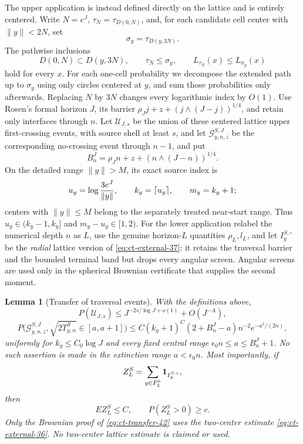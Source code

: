 \documentclass[12pt,reqno]{amsart}
\theoremstyle{plain}
\newtheorem{lemma}[theorem]{Lemma}
\theoremstyle{definition}
\theoremstyle{remark}
\numberwithin{equation}{section}
\begin{document}
The upper application is instead defined directly on the lattice and is
entirely centered.  Write $N=e^J$, $\tau_N=\tau_{D(0,N)}$, and, for
each candidate cell center with $\|y\|<2N$, set
\begin{equation}
\sigma_y=\tau_{D(y,3N)}.\label{eq:ct-transfer-39k}
\end{equation}
The pathwise inclusions
\begin{equation}
D(0,N)\subset D(y,3N),\qquad \tau_N\le\sigma_y,
 \qquad L_{\tau_N}(x)\le L_{\sigma_y}(x)\label{eq:ct-transfer-39l}
\end{equation}
hold for every $x$.  For each one-cell probability we decompose the
extended path up to $\sigma_y$ using only circles centered at $y$,
and sum those probabilities only afterwards.  Replacing $N$ by $3N$
changes every logarithmic index by $O(1)$.  Use Rosen's formal horizon
$J$, its barrier $\rho_Jj+z+(j\wedge(J-j))^{1/4}$, and retain only
interfaces through $n$.  Let $\mathcal{U}_{J,s}$ be the union of these
centered lattice upper first-crossing events, with source shell at least
$s$, and let
$\mathcal{G}^{S,J}_{y,n,z}$ be the corresponding no-crossing event through
$n-1$, and put
\[
B_n^J=\rho_Jn+z+(n\wedge(J-n))^{1/4}.
\]
On the detailed range $\|y\|>M$, its exact source index is
\begin{equation}
u_y=\log {3e^J\over\|y\|},\qquad
 k_y=\lceil u_y\rceil,\qquad m_y=k_y+1;\label{eq:ct-transfer-39m}
\end{equation}
centers with $\|y\|\le M$ belong to the separately treated near-start
range.  Thus $u_y\in(k_y-1,k_y]$ and $m_y-u_y\in[1,2)$.
For the lower application relabel the numerical depth $n$ as $L$,
use the genuine horizon-$L$ quantities $\rho_L,l_L$, and let
$I_y^{S,\circ}$ be the \emph{radial} lattice version of \eqref{eq:ct-external-37}: it retains
the traversal barrier and the bounded terminal band but drops every
angular screen.  Angular screens are used only in the spherical
Brownian certificate that supplies the second moment.

\begin{lemma}[Transfer of traversal events]\label{lem:buffered-transfer}
With the definitions above,
\begin{equation}
P(\mathcal{U}_{J,s})\le J^{-2s/\log J+o(1)}+O(J^{-A}),\label{eq:ct-transfer-40}
\end{equation}
\begin{equation}
P\big(\mathcal{G}^{S,J}_{y,n,z},
       \sqrt{2T^S_{y,n}}\in[a,a+1]\big)
 \le C(k_y+1)^C(2+B_n^J-a)n^{-2}e^{-a^2/(2n)},\label{eq:ct-transfer-41}
\end{equation}
uniformly for $k_y\le C_0\log J$ and every fixed central range
$\epsilon_0n\le a\le B_n^J+1$.  No such assertion is made in the
extinction range $a<\epsilon_0n$.  Most importantly, if
\[
Z_L^S=\sum_{y\in F_L^0}{\bf1}_{I_y^{S,\circ}},
\]
then
\begin{equation}
EZ_L^S\le C,\qquad P(Z_L^S>0)\ge c.\label{eq:ct-transfer-42}
\end{equation}
Only the Brownian proof of \eqref{eq:ct-transfer-42} uses the two-center estimate \eqref{eq:ct-external-36}.
No two-center lattice estimate is claimed or used.

\end{lemma}
\end{document}
